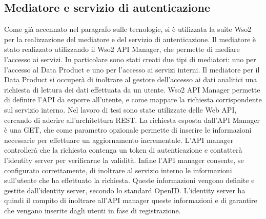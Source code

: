 \documentclass[12pt]{report}
\begin{document}
\subsection{Mediatore e servizio di autenticazione}
Come già accennato nel paragrafo sulle tecnologie, si è utilizzata la suite Wso2 per la realizzazione del mediatore e del servizio di autenticazione.
Il mediatore è stato realizzato utilizzando il Wso2 API Manager, che permette di mediare l'accesso ai servizi.
In particolare sono stati creati due tipi di mediatori: uno per l'accesso al Data Product e uno per l'accesso ai servizi interni.
Il mediatore per il Data Product si occuperà di inoltrare al gestore dell'accesso ai dati analitici una richiesta di lettura dei dati effettuata da un utente.
Wso2 API Manager permette di definire l'API da esporre all'utente, e come mappare la richiesta corrispondente sul servizio interno. 
Nel lavoro di tesi sono state utilizzate delle Web API, cercando di aderire all'architettura REST.
La richiesta esposta dall'API Manager è una GET, che come parametro opzionale permette di inserire le informazioni necessarie per effettuare un aggiornamento incrementale.
L'API manager controllerà che la richiesta contenga un token di autenticazione e contatterà l'identity server per verificarne la validità.
Infine l'API manager consente, se configurato correttamente, di inoltrare al servizio interno le informazioni sull'utente che ha effettuato la richiesta. 
Queste informazioni vengono definite e gestite dall'identity server, secondo lo standard OpenID.
L'identity server ha quindi il compito di inoltrare all'API manager queste informazioni e di garantire che vengano inserite dagli utenti in fase di registrazione.
\end{document}
